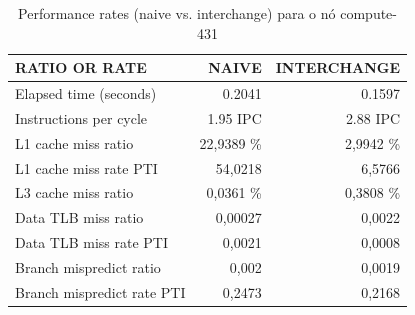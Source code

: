 \documentclass[conference,compsoc]{IEEEtran}
\begin{document}
\begin{table}[H]
\caption{Performance rates (naive vs. interchange) para o nó compute-431}
\label{table:search_rates}
\centering
\begin{tabular}{ | l | r | r |   }

\hline
RATIO OR RATE		 & NAIVE  & INTERCHANGE \\ \hline 
Elapsed time (seconds) & 0.2041 & 0.1597   \\ \hline      

Instructions per cycle  & 1.95  IPC & 2.88 IPC       \\ \hline      




L1 cache miss ratio	  & 22,9389 \%   &     2,9942 \%    \\ \hline      


  L1 cache miss rate PTI &  54,0218 &     6,5766    \\ \hline     


  L3 cache miss ratio	  & 0,0361 \%   &     0,3808 \%   \\ \hline      



  Data TLB miss ratio	 &    0,00027 &   0,0022     \\ \hline      

  Data TLB miss rate PTI	 &   0,0021 &   0,0008    \\ \hline      

  Branch mispredict ratio	 & 0,002   &     0,0019  \\ \hline      


  Branch mispredict rate PTI	 &  0,2473   &   0,2168    \\ \hline          

  \end{tabular}
  \end{table}
\end{document}
